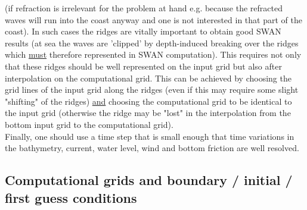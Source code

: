 \documentclass[12pt]{book}
\begin{document}
(if refraction is irrelevant for the problem at hand e.g. because the refracted waves will run into the coast
anyway and one is not interested in that part of the coast). In such cases the ridges are vitally important
to obtain good SWAN results (at sea the waves are 'clipped' by depth-induced breaking over the ridges
which \underline{must} therefore represented in SWAN computation). This requires not only that these ridges
should be well represented on the input grid but also after interpolation on the computational grid. This
can be achieved by choosing the grid lines of the input grid along the ridges (even if this may require some
slight "shifting" of the ridges) \underline{and} choosing the computational grid to be identical to the
input grid (otherwise the ridge may be "lost" in the interpolation from the bottom input grid to the
computational grid).
\\[2ex]
\noindent
Finally, one should use a time step that is small enough that time variations in the bathymetry, current,
water level, wind and bottom friction are well resolved.

\subsection{Computational grids and boundary / initial / first guess conditions}
\label{sec:boundc}
\end{document}
